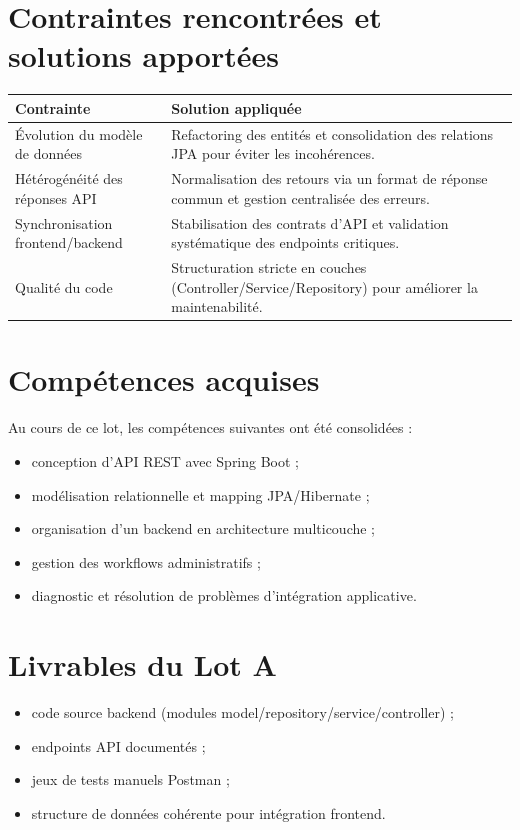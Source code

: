 \section{Contraintes rencontrées et solutions apportées}
\begin{tabularx}{\textwidth}{lX}
\toprule
\textbf{Contrainte} & \textbf{Solution appliquée} \\
\midrule
Évolution du modèle de données & Refactoring des entités et consolidation des relations JPA pour éviter les incohérences. \\
Hétérogénéité des réponses API & Normalisation des retours via un format de réponse commun et gestion centralisée des erreurs. \\
Synchronisation frontend/backend & Stabilisation des contrats d'API et validation systématique des endpoints critiques. \\
Qualité du code & Structuration stricte en couches (Controller/Service/Repository) pour améliorer la maintenabilité. \\
\bottomrule
\end{tabularx}

\section{Compétences acquises}
Au cours de ce lot, les compétences suivantes ont été consolidées :
\begin{itemize}
  \item conception d'API REST avec Spring Boot ;
  \item modélisation relationnelle et mapping JPA/Hibernate ;
  \item organisation d'un backend en architecture multicouche ;
  \item gestion des workflows administratifs ;
  \item diagnostic et résolution de problèmes d'intégration applicative.
\end{itemize}

\section{Livrables du Lot A}
\begin{itemize}
  \item code source backend (modules model/repository/service/controller) ;
  \item endpoints API documentés ;
  \item jeux de tests manuels Postman ;
  \item structure de données cohérente pour intégration frontend.
\end{itemize}

